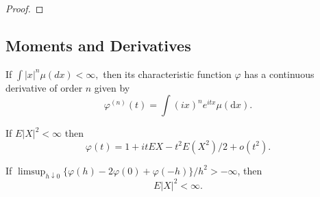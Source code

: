 \begin{proof}

\end{proof}

\subsection{Moments and Derivatives}

\begin{theorem}
    If $\int|x|^{n}\mu(d x)<\infty,$ then its characteristic function $\varphi$ has a continuous derivative of order $n$ given by
    \begin{equation}
        \varphi^{(n)}(t)=\int(i x)^{n}e^{itx}\mu(\mathrm{d}x).
    \end{equation}
\end{theorem}

\begin{theorem}
    If $E|X|^{2}<\infty$ then
    \begin{equation}
        \varphi(t)=1+itEX-t^{2}E\left(X^{2}\right)/2+o\left(t^{2}\right).
    \end{equation}
\end{theorem}

\begin{theorem}
    If $\limsup_{h\downarrow 0}\{\varphi(h)-2\varphi(0)+\varphi(-h)\}/h^{2}>-\infty$, then
    \begin{equation}
        E|X|^{2}<\infty.
    \end{equation}
\end{theorem}